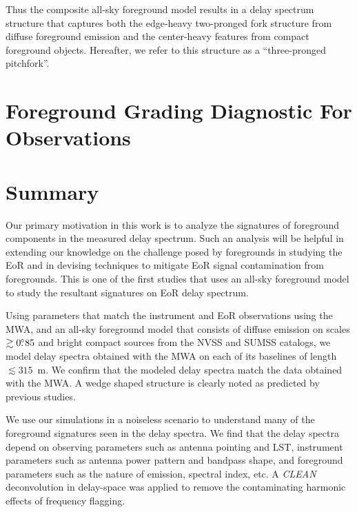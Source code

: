 \documentclass[preprint2,iop,numberedappendix]{emulateapj}
\begin{document}
Thus the composite all-sky foreground model results in a delay spectrum structure that captures both the edge-heavy two-pronged fork structure from diffuse foreground emission and the center-heavy features from compact foreground objects. Hereafter, we refer to this structure as a ``three-pronged pitchfork''. 

\section{Foreground Grading Diagnostic For Observations}\label{sec:fg-grading}




\section{Summary}\label{sec:summary}

Our primary motivation in this work is to analyze the signatures of foreground components in the measured delay spectrum. Such an analysis will be helpful in extending our knowledge on the challenge posed by foregrounds in studying the EoR and in devising techniques to mitigate EoR signal contamination from foregrounds. This is one of the first studies that uses an all-sky foreground model to study the resultant signatures on EoR delay spectrum.

Using parameters that match the instrument and EoR observations using the MWA, and an all-sky foreground model that consists of diffuse emission on scales $\gtrsim 0\mbox{$.\!\!^\circ$} 85$ and bright compact sources from the NVSS and SUMSS catalogs, we model delay spectra obtained with the MWA on each of its baselines of length $\lesssim 315$~m. We confirm that the modeled delay spectra match the data obtained with the MWA. A wedge shaped structure is clearly noted as predicted by previous studies.

We use our simulations in a noiseless scenario to understand many of the foreground signatures seen in the delay spectra. We find that the delay spectra depend on observing parameters such as antenna pointing and LST, instrument parameters such as antenna power pattern and bandpass shape, and foreground parameters such as the nature of emission, spectral index, etc. A {\it CLEAN} deconvolution in delay-space was applied to remove the contaminating harmonic effects of frequency flagging. 
\end{document}
